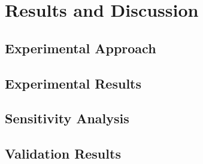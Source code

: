 \chapter{Results and Discussion} \label{cha:results}

\section{Experimental Approach} \label{sec:approach}

\section{Experimental Results} \label{sec:expresults}

\section{Sensitivity Analysis} \label{sec:uncertainty}

\section{Validation Results} \label{sec:validation}
